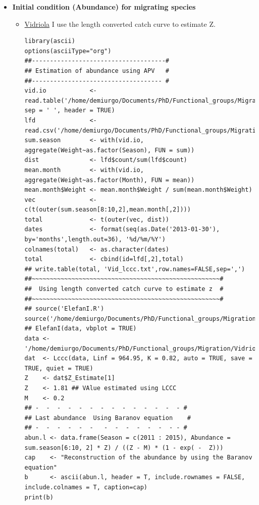 \documentclass[11pt]{article}
\begin{document}
\begin{itemize}
\begin{itemize}
\item \textbf{Initial condition (Abundance) for migrating species}
\begin{itemize}
\item \underline{Vidriola}
         I use the length converted catch curve to estimate Z.

\begin{verbatim}
library(ascii)
options(asciiType="org")
##-------------------------------------#
## Estimation of abundance using APV   #
##------------------------------------ #
vid.io            <- read.table('/home/demiurgo/Documents/PhD/Functional_groups/Migration/Vidriola/Vid_month.txt', sep = ' ', header = TRUE)
lfd               <- read.csv('/home/demiurgo/Documents/PhD/Functional_groups/Migration/Vidriola/VID.csv')
sum.season        <- with(vid.io, aggregate(Weight~as.factor(Season), FUN = sum))
dist              <- lfd$count/sum(lfd$count)
mean.month        <- with(vid.io, aggregate(Weight~as.factor(Month), FUN = mean))
mean.month$Weight <- mean.month$Weight / sum(mean.month$Weight)
vec               <- c(t(outer(sum.season[8:10,2],mean.month[,2])))
total             <- t(outer(vec, dist))
dates             <- format(seq(as.Date('2013-01-30'), by='months',length.out=36), '%d/%m/%Y')
colnames(total)   <- as.character(dates)
total             <- cbind(id=lfd[,2],total)
## write.table(total, 'Vid_lccc.txt',row.names=FALSE,sep=',')
##~~~~~~~~~~~~~~~~~~~~~~~~~~~~~~~~~~~~~~~~~~~~~~~~~~~~#
##  Using length converted catch curve to estimate z  #
##~~~~~~~~~~~~~~~~~~~~~~~~~~~~~~~~~~~~~~~~~~~~~~~~~~~~#
## source('ElefanI.R')
source('/home/demiurgo/Documents/PhD/Functional_groups/Migration/Vidriola/Lccc.R')
## ElefanI(data, vbplot = TRUE)
data <- '/home/demiurgo/Documents/PhD/Functional_groups/Migration/Vidriola/Vid_lccc.txt'
dat  <- Lccc(data, Linf = 964.95, K = 0.82, auto = TRUE, save = TRUE, quiet = TRUE)
Z    <- dat$Z_Estimate[1]
Z    <- 1.81 ## VAlue estimated using LCCC
M    <- 0.2
## -  -  -  -  -  -  -  -  -  -  -  -  -  - #
## Last abundance  Using Baranov equation    #
## -  -  -  -  -  -   -  -  -  -  -  -  - - #
abun.l <- data.frame(Season = c(2011 : 2015), Abundance = sum.season[6:10, 2] * Z) / ((Z - M) * (1 - exp( -  Z)))
cap    <- "Reconstruction of the abundance by using the Baranov equation"
b      <- ascii(abun.l, header = T, include.rownames = FALSE, include.colnames = T, caption=cap)
print(b)
\end{verbatim}
\end{itemize}
\end{itemize}

\end{itemize}
\end{document}
